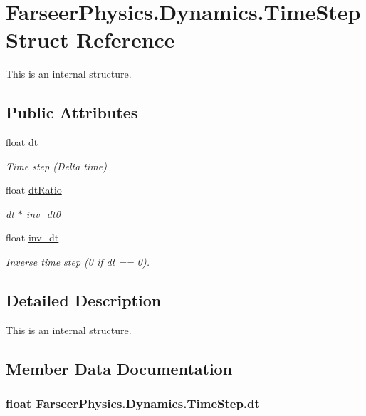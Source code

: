 \hypertarget{struct_farseer_physics_1_1_dynamics_1_1_time_step}{\section{Farseer\+Physics.\+Dynamics.\+Time\+Step Struct Reference}
\label{struct_farseer_physics_1_1_dynamics_1_1_time_step}
}


This is an internal structure.  


\subsection*{Public Attributes}
\begin{DoxyCompactItemize}
\item 
float \hyperlink{struct_farseer_physics_1_1_dynamics_1_1_time_step_afed27d563ffeaf01d14c0702330173d1}{dt}
\begin{DoxyCompactList}\small\item\em Time step (Delta time) \end{DoxyCompactList}\item 
float \hyperlink{struct_farseer_physics_1_1_dynamics_1_1_time_step_a57f084fc9f6903f887c6c825acf487f0}{dt\+Ratio}
\begin{DoxyCompactList}\small\item\em dt $\ast$ inv\+\_\+dt0 \end{DoxyCompactList}\item 
float \hyperlink{struct_farseer_physics_1_1_dynamics_1_1_time_step_a38654fdd48ccb57419339600eac4fe64}{inv\+\_\+dt}
\begin{DoxyCompactList}\small\item\em Inverse time step (0 if dt == 0). \end{DoxyCompactList}\end{DoxyCompactItemize}


\subsection{Detailed Description}
This is an internal structure. 



\subsection{Member Data Documentation}
\hypertarget{struct_farseer_physics_1_1_dynamics_1_1_time_step_afed27d563ffeaf01d14c0702330173d1}{
\subsubsection[{dt}]{\setlength{\rightskip}{0pt plus 5cm}float Farseer\+Physics.\+Dynamics.\+Time\+Step.\+dt}}\label{struct_farseer_physics_1_1_dynamics_1_1_time_step_afed27d563ffeaf01d14c0702330173d1}


